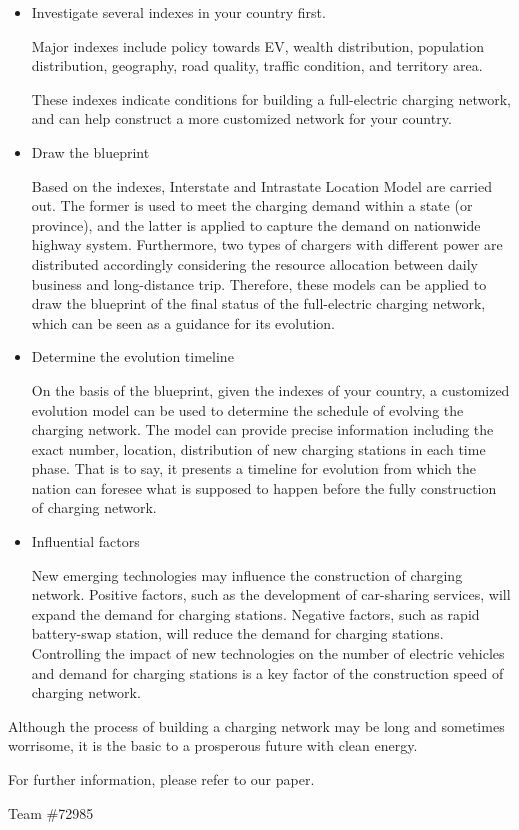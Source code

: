 \documentclass{mcmthesis}
\begin{document}
\begin{itemize}
\item Investigate several indexes in your country first.

Major indexes include policy towards EV, wealth distribution, population distribution, geography, road quality, traffic condition, and territory area.

These indexes indicate conditions for building a full-electric charging network, and can help construct a more customized network for your country.
\item Draw the blueprint

Based on the indexes, Interstate and Intrastate Location Model are carried out. The former is used to meet the charging demand within a state (or province), and the latter is applied to capture the demand on nationwide highway system. Furthermore, two types of chargers with different power are distributed accordingly considering the resource allocation between daily business and long-distance trip. Therefore, these models can be applied to draw the blueprint of the final status of the full-electric charging network, which can be seen as a guidance for its evolution.
\item Determine the evolution timeline

On the basis of the blueprint, given the indexes of your country, a customized evolution model can be used to determine the schedule of evolving the charging network. The model can provide precise information including the exact number, location, distribution of new charging stations in each time phase. That is to say, it presents a timeline for evolution from which the nation can foresee what is supposed to happen before the fully construction of charging network.
\item Influential factors

New emerging technologies may influence the construction of charging network. Positive factors, such as the development of car-sharing services, will expand the demand for charging stations. Negative factors, such as rapid battery-swap station, will reduce the demand for charging stations. Controlling the impact of new technologies on the number of electric vehicles and demand for charging stations is a key factor of the construction speed of charging network.
\end{itemize}

Although the process of building a charging network may be long and sometimes worrisome, it is the basic to a prosperous future with clean energy.

For further information, please refer to our paper.

\smallskip

\noindent Team \#72985

\newpage



	
	
	
\end{document}
